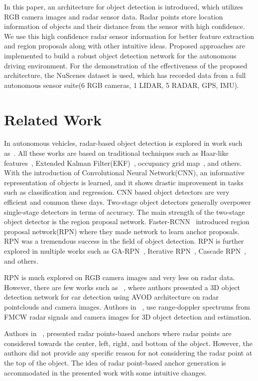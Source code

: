 \documentclass{article}
\begin{document}
In this paper, an architecture for object detection is introduced, which utilizes RGB camera images and radar sensor data. Radar points store location information of objects and their distance from the sensor with high confidence. We use this high confidence radar sensor information for better feature extraction and region proposals along with other intuitive ideas. Proposed approaches are implemented to build a robust object detection network for the autonomous driving environment. For the demonstration of the effectiveness of the proposed architecture, the NuScenes dataset is used, which has recorded data from a full autonomous sensor suite(6 RGB cameras, 1 LIDAR, 5 RADAR, GPS, IMU).

\section{Related Work}
\label{sec:format}
In autonomous vehicles, radar-based object detection is explored in work such as~\cite{chavez2012frontal, duan2016moving, kato2002obstacle, manjunath2018radar}. All these works are based on traditional techniques such as Haar-like features~\cite{neumann2017online}, Extended Kalman Filter(EKF)~\cite{chavez2012frontal}, occupancy grid map~\cite{duan2016moving}, and others.
With the introduction of Convolutional Neural Network(CNN), an informative representation of objects is learned, and it shows drastic improvement in tasks such as classification and regression. CNN based object detectors are very efficient and common these days. Two-stage object detectors generally overpower single-stage detectors in terms of accuracy. The main strength of the two-stage object detector is the region proposal network. Faster-RCNN~\cite{ren2015faster} introduced region proposal network(RPN) where they made network to learn anchor proposals. RPN was a tremendous success in the field of object detection. RPN is further explored in multiple works such as GA-RPN~\cite{wang2019region}, Iterative RPN~\cite{gidaris2016attend}, Cascade RPN~\cite{vu2019cascade}, and others. 

RPN is much explored on RGB camera images and very less on radar data. However, there are few works such as ~\cite{meyer2019deep}, where authors presented a 3D object detection network for car detection using AVOD architecture on radar pointclouds and camera images. Authors in ~\cite{zhang2019object}, use range-doppler spectrums from FMCW radar signals and camera images for 3D object detection and estimation.

Authors in ~\cite{nabati2019rrpn}, presented radar points-based anchors where radar points are considered towards the center, left, right, and bottom of the object. However, the authors did not provide any specific reason for not considering the radar point at the top of the object. The idea of radar point-based anchor generation is accommodated in the presented work with some intuitive changes.
\end{document}
